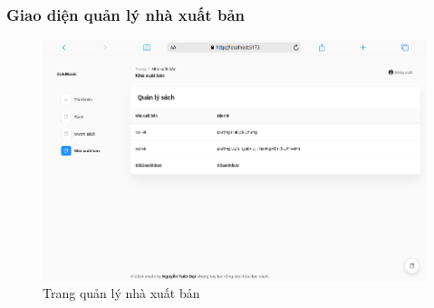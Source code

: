 \subsubsection{Giao diện quản lý nhà xuất bản}
\begin{figure}[H]
  \centering
   \includegraphics[width=1\textwidth]{report/images/admin/nhaxuatban.png}
  \caption{Trang quản lý nhà xuất bản}
\end{figure}

